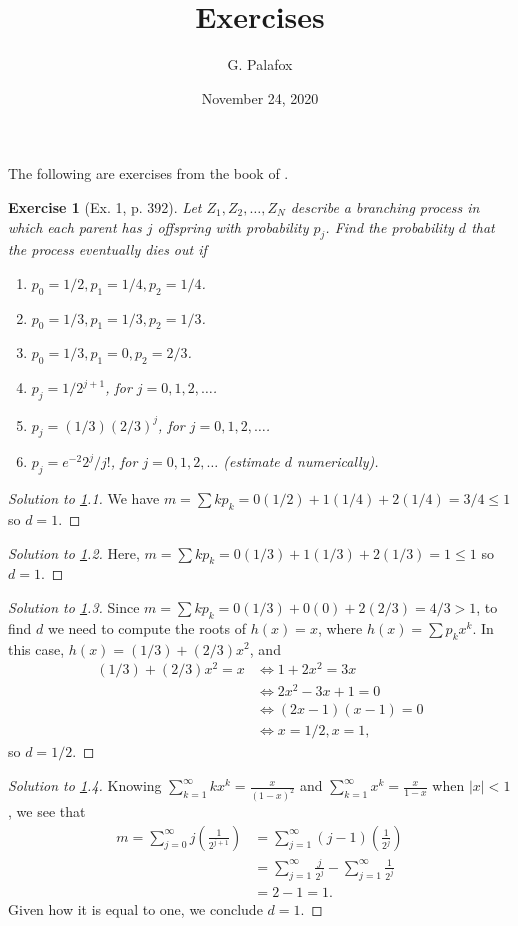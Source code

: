 \documentclass[letterpaper, 10 pt, conference]{article}
\title{Exercises
}
\date{November 24, 2020}
\author{G. Palafox}
\newtheorem{ex}{Exercise}
\begin{document}
\maketitle
The following are exercises from the book of \citet{snell}.

\begin{ex}[Ex. 1, p. 392]\label{ex:1p392}
	Let $Z_1, Z_2, \dots, Z_N$ describe a branching process in which each parent has $j$ offspring with probability $p_j$. Find the probability $d$ that the process eventually dies out if
	\begin{enumerate}
		\item $p_0 = 1/2, p_1 = 1/4, p_2 = 1/4$.
		\item $p_0 = 1/3, p_1 = 1/3, p_2 = 1/3$.
		\item $p_0 = 1/3, p_1 = 0, p_2 = 2/3$.
		\item $p_j = 1/2^{j+1}$, for $j = 0, 1, 2, \dots$.
		\item $p_j = (1/3)(2/3)^{j}$, for $j = 0, 1, 2, \dots$.
		\item $p_j = e^{-2} 2^{j} / j!$, for $j = 0, 1, 2, \dots$ (estimate $d$ numerically).
		\end{enumerate}
\end{ex}
\begin{proof}[Solution to \ref{ex:1p392}.1]
	We have $m = \sum k p_k = 0(1/2) + 1 (1/4) + 2 (1/4) = 3/4 \leq 1$ so $d = 1$.
\end{proof}
\begin{proof}[Solution to \ref{ex:1p392}.2]
	Here, $m = \sum k p_k = 0 (1/3) + 1 (1/3) + 2(1/3) = 1 \leq 1$ so $d = 1$.
\end{proof}
\begin{proof}[Solution to \ref{ex:1p392}.3]
	Since $m = \sum k p_k = 0 (1/3) + 0 (0) + 2(2/3) = 4/3 > 1$, to find $d$ we need to compute the roots of $h(x) = x$, where $h(x) = \sum p_k x^k$. In this case, $h(x) = (1/3) + (2/3)x^2$, and 
	\begin{align}
		(1/3) + (2/3) x^2 = x &\Leftrightarrow 1 + 2 x^2 = 3x \\
		&\Leftrightarrow 2 x^2 - 3x + 1 = 0 \\
		&\Leftrightarrow (2x-1)(x-1) = 0\\
		&\Leftrightarrow x = 1/2, x = 1,
	\end{align}
	so $d=1/2$.
\end{proof}
\begin{proof}[Solution to \ref{ex:1p392}.4]
	Knowing $\sum_{k = 1}^{\infty} k x^k = \frac{x}{(1-x)^2}$ and $\sum_{k = 1}^{\infty} x^k = \frac{x}{1-x}$ when $|x| < 1$, we see that
	\begin{align}
		m = \sum_{j = 0}^{\infty} j \left(\frac{1}{2^{j+1}}\right) &= \sum_{j=1}^{\infty} (j-1) \left(\frac{1}{2^{j}}\right)\\
		&= \sum_{j=1}^\infty \frac{j}{2^j} - \sum_{j=1}^\infty \frac{1}{2^j} \\
		&= 2 - 1 = 1.
	\end{align}
	Given how it is equal to one, we conclude $d = 1$.
\end{proof}
\end{document}
